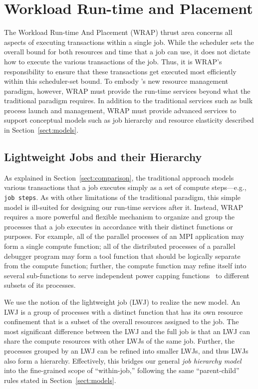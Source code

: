 \section{Workload Run-time and Placement} 
\label{sect:WRAP}

The Workload Run-time And Placement (WRAP) thrust area concerns all aspects of
executing transactions within a single job. 
While the scheduler sets the overall bound for both resources and time that a job 
can use, it does not dictate how to execute the various transactions of the job.
Thus, it is WRAP's responsibility to ensure that these transactions get executed 
most efficiently within this scheduler-set bound.
To embody \ngrm's new resource management paradigm, however, WRAP must provide the run-time
services beyond what the traditional paradigm requires. 
In addition to the traditional services such as bulk process launch and 
management, WRAP must provide advanced services to 
support conceptual models such as job hierarchy and resource elasticity 
described in Section~\ref{sect:models}.

\subsection{Lightweight Jobs and their Hierarchy}

As explained in Section~\ref{sect:comparison}, the traditional
approach models various transactions that a job executes simply as a set of
compute steps---e.g., {\tt job steps}.
As with other limitations of the traditional paradigm, this simple model
is ill-suited for designing our run-time services after it. 
Instead, WRAP requires a more powerful and flexible mechanism
to organize and group the processes that a job executes 
in accordance with their distinct functions or purposes. 
For example, all of the parallel processes of an MPI application may form a single 
compute function; all of the distributed processes of a parallel
debugger program may form a tool function that should be logically separate from 
the compute function; further, the compute function
may refine itself into several sub-functions to serve
independent power capping functions~\cite{RountreeRAPL} to different subsets of its processes.  

We use the notion of the lightweight job (LWJ) to realize the new model. 
An LWJ is a group of processes with a distinct function 
that has its own resource confinement that is a subset of 
the overall resources assigned to the job.
The most significant difference between the LWJ and the full job is that an LWJ
can share the compute resources with other LWJs of the same job. 
Further, the processes grouped by an LWJ can be refined into smaller LWJs,
and thus LWJs also form a hierarchy. Effectively, this bridges 
our general {\em job hierarchy model} into the fine-grained 
scope of ``within-job,'' following the same ``parent-child'' rules stated
in Section~\ref{sect:models}.

